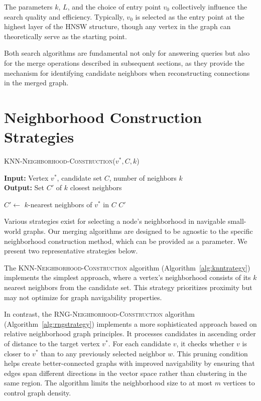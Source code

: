 \documentclass{article}
\begin{document}
The parameters $k$, $L$, and the choice of entry point $v_0$ collectively influence the search quality and efficiency. Typically, $v_0$ is selected as the entry point at the highest layer of the HNSW structure, though any vertex in the graph can theoretically serve as the starting point.

Both search algorithms are fundamental not only for answering queries but also for the merge operations described in subsequent sections, as they provide the mechanism for identifying candidate neighbors when reconstructing connections in the merged graph.

\section{Neighborhood Construction Strategies}

\begin{algorithm}
\caption{\textsc{KNN-Neighborhood-Construction}($v^*, C, k$)}\label{alg:knntrategy}
\textbf{Input:} Vertex $v^*$, candidate set $C$, number of neighbors $k$ \\
\textbf{Output:} Set $C'$ of $k$ closest neighbors
\begin{algorithmic}[1]
\State $C' \gets$ $k$-nearest neighbors of $v^*$ in $C$
\State \Return $C'$
\end{algorithmic}
\end{algorithm}

Various strategies exist for selecting a node's neighborhood in navigable small-world graphs. Our merging algorithms are designed to be agnostic to the specific neighborhood construction method, which can be provided as a parameter. We present two representative strategies below.

The \textsc{KNN-Neighborhood-Construction} algorithm (Algorithm~\ref{alg:knntrategy}) implements the simplest approach, where a vertex's neighborhood consists of its $k$ nearest neighbors from the candidate set. This strategy prioritizes proximity but may not optimize for graph navigability properties.

In contrast, the \textsc{RNG-Neighborhood-Construction} algorithm (Algorithm~\ref{alg:rngstrategy}) implements a more sophisticated approach based on relative neighborhood graph principles. It processes candidates in ascending order of distance to the target vertex $v^*$. For each candidate $v$, it checks whether $v$ is closer to $v^*$ than to any previously selected neighbor $w$. This pruning condition helps create better-connected graphs with improved navigability by ensuring that edges span different directions in the vector space rather than clustering in the same region. The algorithm limits the neighborhood size to at most $m$ vertices to control graph density.
\end{document}
